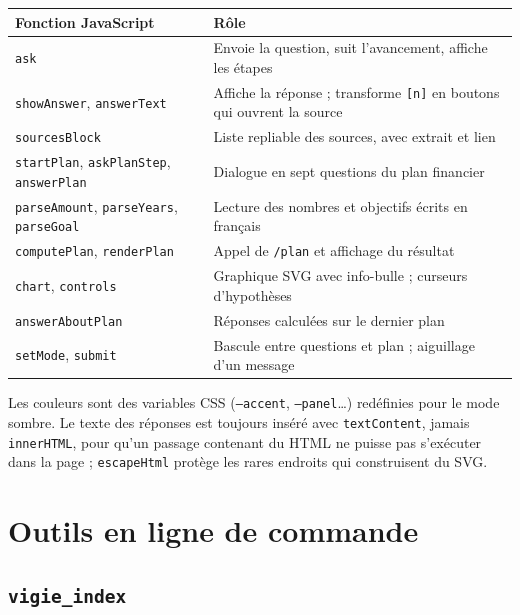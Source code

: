 \documentclass[11pt,a4paper]{article}
\newcommand{\fichier}[1]{\texttt{#1}}
\begin{document}
\begin{center}
\small
\begin{tabularx}{\linewidth}{@{}l X@{}}
\toprule
Fonction JavaScript & Rôle \\
\midrule
\texttt{ask} & Envoie la question, suit l'avancement, affiche les étapes \\
\texttt{showAnswer}, \texttt{answerText} & Affiche la réponse ; transforme \texttt{[n]} en boutons qui ouvrent la source \\
\texttt{sourcesBlock} & Liste repliable des sources, avec extrait et lien \\
\texttt{startPlan}, \texttt{askPlanStep}, \texttt{answerPlan} & Dialogue en sept questions du plan financier \\
\texttt{parseAmount}, \texttt{parseYears}, \texttt{parseGoal} & Lecture des nombres et objectifs écrits en français \\
\texttt{computePlan}, \texttt{renderPlan} & Appel de \texttt{/plan} et affichage du résultat \\
\texttt{chart}, \texttt{controls} & Graphique SVG avec info-bulle ; curseurs d'hypothèses \\
\texttt{answerAboutPlan} & Réponses calculées sur le dernier plan \\
\texttt{setMode}, \texttt{submit} & Bascule entre questions et plan ; aiguillage d'un message \\
\bottomrule
\end{tabularx}
\end{center}



Les couleurs sont des variables CSS (\texttt{--accent}, \texttt{--panel}\dots) redéfinies pour le mode sombre. Le texte des réponses est toujours inséré avec \texttt{textContent}, jamais \texttt{innerHTML}, pour qu'un passage contenant du HTML ne puisse pas s'exécuter dans la page ; \texttt{escapeHtml} protège les rares endroits qui construisent du SVG.

\section{Outils en ligne de commande}

\subsection{\texttt{vigie\_index}}
\end{document}

